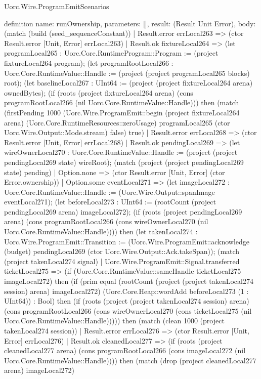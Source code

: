 \begin{lexlean}{Uorc.Wire.ProgramEmitScenarios}
\begin{semanticmodule}
definition{
  name: runOwnership,
  parameters: [],
  result: (Result Unit Error),
  body: (match (build (seed_sequenceConstant))
    | Result.error errLocal263 => (ctor Result.error [Unit, Error] errLocal263)
    | Result.ok fixtureLocal264 => (let programLocal265 : Uorc.Core.RuntimeProgram::Program := (project fixtureLocal264 program); (let programRootLocal266 : Uorc.Core.RuntimeValue::Handle := (project (project programLocal265 blocks) root); (let baselineLocal267 : UInt64 := (project (project fixtureLocal264 arena) ownedBytes); (if (roots (project fixtureLocal264 arena) (cons programRootLocal266 (nil Uorc.Core.RuntimeValue::Handle))) then (match (firstPending 1000 (Uorc.Wire.ProgramEmit::begin (project fixtureLocal264 arena) (Uorc.Core.RuntimeResources::zeroUsage) programLocal265 (ctor Uorc.Wire.Output::Mode.stream) false) true)
      | Result.error errLocal268 => (ctor Result.error [Unit, Error] errLocal268)
      | Result.ok pendingLocal269 => (let wireOwnerLocal270 : Uorc.Core.RuntimeValue::Handle := (project (project pendingLocal269 state) wireRoot); (match (project (project pendingLocal269 state) pending)
        | Option.none => (ctor Result.error [Unit, Error] (ctor Error.ownership))
        | Option.some eventLocal271 => (let imageLocal272 : Uorc.Core.RuntimeValue::Handle := (Uorc.Wire.Output::spanImage eventLocal271); (let beforeLocal273 : UInt64 := (rootCount (project pendingLocal269 arena) imageLocal272); (if (roots (project pendingLocal269 arena) (cons programRootLocal266 (cons wireOwnerLocal270 (nil Uorc.Core.RuntimeValue::Handle)))) then (let takenLocal274 : Uorc.Wire.ProgramEmit::Transition := (Uorc.Wire.ProgramEmit::acknowledge (budget) pendingLocal269 (ctor Uorc.Wire.Output::Ack.takeSpan)); (match (project takenLocal274 signal)
          | Uorc.Wire.ProgramEmit::Signal.transferred ticketLocal275 => (if (Uorc.Core.RuntimeValue::sameHandle ticketLocal275 imageLocal272) then (if (prim equal (rootCount (project (project takenLocal274 session) arena) imageLocal272) (Uorc.Core.Heap::wordAdd beforeLocal273 (1 : UInt64)) : Bool) then (if (roots (project (project takenLocal274 session) arena) (cons programRootLocal266 (cons wireOwnerLocal270 (cons ticketLocal275 (nil Uorc.Core.RuntimeValue::Handle))))) then (match (clean 1000 (project takenLocal274 session))
            | Result.error errLocal276 => (ctor Result.error [Unit, Error] errLocal276)
            | Result.ok cleanedLocal277 => (if (roots (project cleanedLocal277 arena) (cons programRootLocal266 (cons imageLocal272 (nil Uorc.Core.RuntimeValue::Handle)))) then (match (drop (project cleanedLocal277 arena) imageLocal272)
}
\end{semanticmodule}
\end{lexlean}
